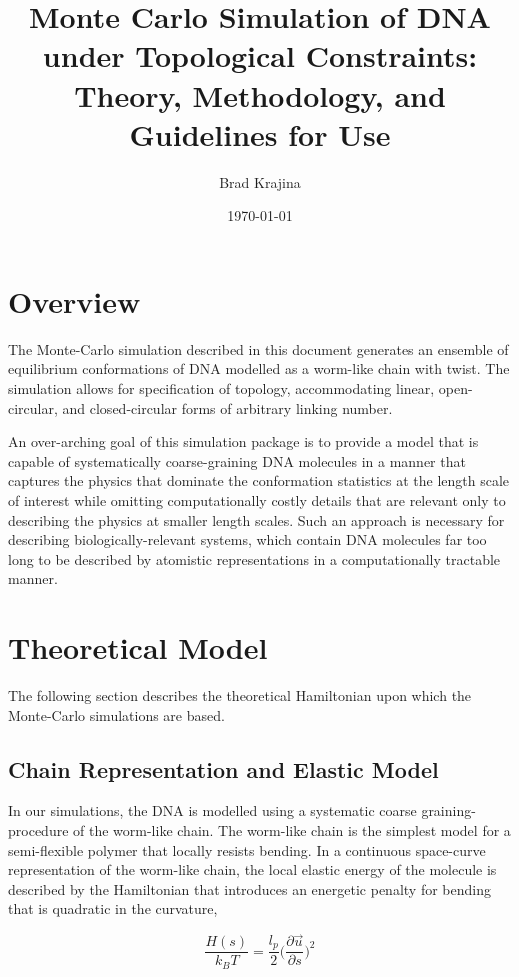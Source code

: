 \documentclass[english]{article}
\begin{document}
 
\title{Monte Carlo Simulation of DNA under Topological Constraints: Theory, Methodology, and Guidelines for Use} \author{Brad Krajina} \date{\today} 
\maketitle

\tableofcontents
\newpage

\section{Overview}
The Monte-Carlo simulation described in this document generates an ensemble of equilibrium conformations of DNA modelled as a worm-like chain with twist. The simulation allows for specification of topology, accommodating linear, open-circular, and closed-circular forms of arbitrary linking number.

An over-arching goal of this simulation package is to provide a model that is capable of systematically coarse-graining DNA molecules in a manner that captures the physics that dominate the conformation statistics at the length scale of interest while omitting computationally costly details that are relevant only to describing the physics at smaller length scales. Such an approach is necessary for describing biologically-relevant systems, which contain DNA molecules far too long to be described by atomistic representations in a computationally tractable manner.


\section{Theoretical Model}
The following section describes the theoretical Hamiltonian upon which the Monte-Carlo simulations are based.
\subsection{Chain Representation and Elastic Model}
In our simulations, the DNA is modelled using a systematic coarse graining-procedure of the worm-like chain. The worm-like chain is the simplest model for a semi-flexible polymer that locally resists bending. In a continuous space-curve representation of the worm-like chain, the local elastic energy of the molecule is described by the Hamiltonian that introduces an energetic penalty for bending that is quadratic in the curvature,

\begin{equation}
\frac{H(s)}{k_BT}=\frac{l_p}{2}\Big(\frac{\partial{\vec{u}}}{\partial{s}}\Big)^2
\end{equation}
\end{document}
